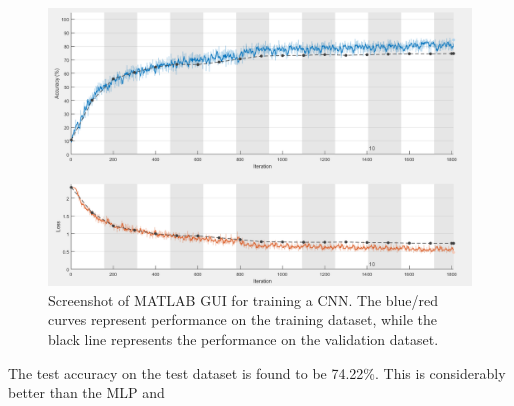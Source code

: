 \begin{figure}[h!]
	\centering
	\includegraphics[width=\textwidth]{images/CNNTrain}
	\caption{Screenshot of MATLAB GUI for training a CNN. The blue/red curves represent performance on the training dataset, while the black line represents the performance on the validation dataset.}
	\label{fig:CNNTrain}
\end{figure}

The test accuracy on the test dataset is found to be 74.22\%. This is considerably better than the MLP and 



    
